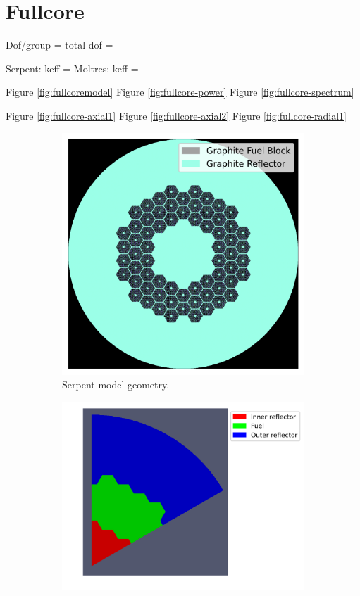 \documentclass[11pt,letterpaper]{article}
\begin{document}
\section{Fullcore}

Dof/group =
total dof = 

Serpent: keff = 
Moltres: keff = 

Figure \ref{fig:fullcoremodel}
Figure \ref{fig:fullcore-power}
Figure \ref{fig:fullcore-spectrum}

Figure \ref{fig:fullcore-axial1}
Figure \ref{fig:fullcore-axial2}
Figure \ref{fig:fullcore-radial1}

\begin{figure}[htbp!]
	\centering
	\begin{subfigure}[t]{0.4\textwidth}
		\centering
		\includegraphics[width=\linewidth]{figures-fullcore/oecd-fullcore}
		\caption{Serpent model geometry.}
	\end{subfigure}
	\begin{subfigure}[t]{0.4\textwidth}
		\centering
		\includegraphics[width=\linewidth]{figures-fullcore/3D-fullcore-60-homo-meshB2}

\end{subfigure}
\end{figure}
\end{document}
